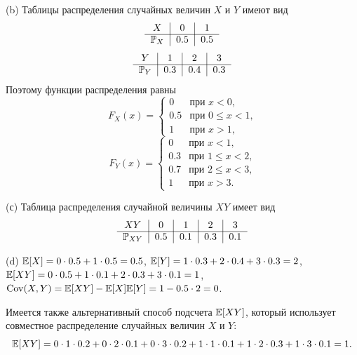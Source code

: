 \documentclass[12pt, a4paper]{article}\usepackage[]{graphicx}\usepackage[]{color}
\begin{document}
				(b) Таблицы распределения случайных величин $X$ и $Y$ имеют вид
				\[
				\begin{tabular}{c|c|c}
				$X$             & $0$     & $1$    \\ \cline{1-3}
				$\P_X$  & $0.5$   & $0.5$  \\
				\end{tabular}
				\]
				\[
				\begin{tabular}{c|c|c|c}
				$Y$             & $1$     & $2$     & $3$   \\ \cline{1-4}
				$\P_Y$  & $0.3$   & $0.4$   & $0.3$ \\
				\end{tabular}
				\]
				Поэтому функции распределения равны
				\[
				F_X(x) =
				\begin{cases}
				0                   &   \text{при $x < 0$,} \\
				0.5                 &   \text{при $0 \leq x < 1$,} \\
				1                   &   \text{при $x > 1$,}
				\end{cases}
				\]
				\[
				F_Y(x) =
				\begin{cases}
				0                   &   \text{при $x < 1$,} \\
				0.3                 &   \text{при $1 \leq x < 2$,} \\
				0.7                 &   \text{при $2 \leq x < 3$,} \\
				1                   &   \text{при $x > 3$.}
				\end{cases}
				\]

				(с) Таблица распределения случайной величины $XY$ имеет вид
				\[
				\begin{tabular}{c|c|c|c|c}
				$XY$               & $0$     & $1$     & $2$     & $3$ \\ \cline{1-5}
				$\P_{XY}$  & $0.5$   & $0.1$   & $0.3$   & $0.1$ \\
				\end{tabular}
				\]

				(d) $\mathbb{E}[X] = 0 \cdot 0.5 + 1 \cdot 0.5 = 0.5$, $\mathbb{E}[Y] = 1 \cdot 0.3 + 2 \cdot 0.4 + 3 \cdot 0.3 = 2$, $\mathbb{E}[XY] = 0 \cdot 0.5 + 1 \cdot 0.1 + 2 \cdot 0.3 + 3 \cdot 0.1 = 1$, $\operatorname{Cov}(X,Y) = \mathbb{E}[XY] - \mathbb{E}[X]\mathbb{E}[Y] = 1 - 0.5 \cdot 2 = 0$.

				Имеется также альтернативный способ подсчета $\mathbb{E}[XY]$, который использует совместное распределение случайных величин $X$ и $Y$:
				\[
				\mathbb{E}[XY] = 0\cdot1\cdot0.2 + 0\cdot2\cdot0.1 + 0\cdot3\cdot0.2 + 1\cdot1\cdot0.1 + 1\cdot2\cdot0.3 + 1\cdot3\cdot0.1 = 1 \text{.}
				\]
\end{document}
